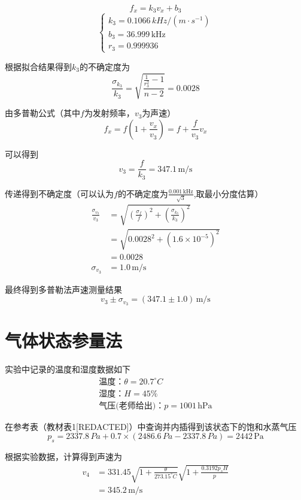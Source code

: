 \documentclass[10pt, twocolumn]{article}
\begin{document}
\begin{equation*}
    f_x=k_3v_x+b_3
\end{equation*}
\begin{equation*}
    \begin{cases}
        k_3=0.1066\,kHz/(m \cdot s^{-1}) \\
        b_3=36.999\,\text{kHz} \\
        r_3=0.999936
    \end{cases}
\end{equation*}
\par
根据拟合结果得到$k_3$的不确定度为
\[
    \frac{\sigma_{k_3}}{k_3}=\sqrt{\frac{\frac{1}{r_3^2}-1}{n-2}}=0.0028
\]
\par
由多普勒公式（其中$f$为发射频率，$v_3$为声速）
\[
    f_x=f(1+\frac{v_x}{v_3})=f+\frac{f}{v_3}v_x
\]
\par
可以得到
\[
    v_3=\frac{f}{k_3}=347.1\,\text{m/s}
\]
\par
传递得到不确定度（可以认为$f$的不确定度为$\frac{0.001\,\text{kHz}}{\sqrt{3}}$,取最小分度估算）
\[
\begin{aligned}
    \frac{\sigma_{v_3}}{v_3}&=\sqrt{(\frac{\sigma_f}{f})^2+(\frac{\sigma_{k_3}}{k_3})^2} \\
                    &=\sqrt{0.0028^2+(1.6\times10^{-5})^2} \\
                    &=0.0028\\
    \sigma_{v_3}&=1.0\,\text{m/s}
\end{aligned}
\]
\par
最终得到多普勒法声速测量结果
\begin{equation}
    v_3\pm \sigma_{v_3}=(347.1\pm1.0)\,\text{m/s}
\end{equation}

\section{气体状态参量法}
实验中记录的温度和湿度数据如下
\[
\begin{array}{l}
    \text{温度}：\theta=20.7^\circ C\\
    \text{湿度}：H=45\% \\
    \text{气压(老师给出)}：p=1001\,\text{hPa}
\end{array}
\]
\par 在参考表（教材表1[REDACTED]）中查询并内插得到该状态下的饱和水蒸气压
\[
    p_s=2337.8\,Pa+0.7\times(2486.6\,Pa-2337.8\,Pa)=2442\,\text{Pa}
\]
\par
根据实验数据，计算得到声速为
\begin{equation}
    \begin{aligned}
    v_4&=331.45\sqrt{1+\frac{\theta}{273.15^{\circ} C}}\sqrt{1+\frac{0.3192p_sH}{p}} \\
     &=345.2\,\text{m/s}
    \end{aligned}
\end{equation}
\end{document}
